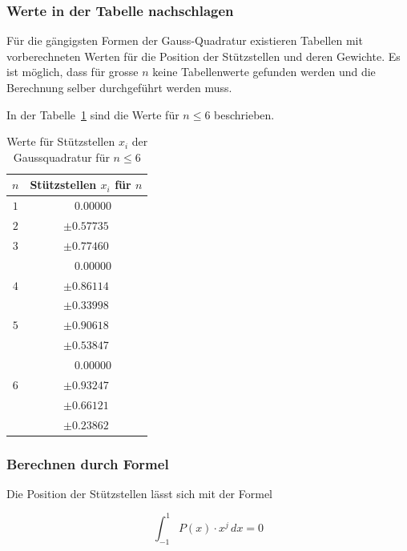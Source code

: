 \subsubsection{Werte in der Tabelle nachschlagen}
Für die gängigsten Formen der Gauss-Quadratur existieren Tabellen mit vorberechneten Werten für die
Position der Stützstellen und deren Gewichte. 
Es ist möglich, dass für grosse $n$ keine Tabellenwerte gefunden werden und die Berechnung 
selber durchgeführt werden muss.

In der Tabelle~\ref{buch:table:gaussabscissenwerte} sind die Werte für $n \leq 6$ beschrieben.

\begin{table}[h!]
    \centering
    \begin{tabular}{|c|c|}
        \hline
        $n$ & Stützstellen $x_{i}$ für $n$ \\
        \hline
        $1$ & $ \phantom{-} 0.00000 $ \\
        \hline
        $2$ & $ \pm 0.57735 $ \\
        \hline
        $3$ & $ \pm 0.77460 $ \\
            & $ \phantom{-} 0.00000 $ \\
        \hline
        $4$ & $ \pm 0.86114 $ \\
            & $ \pm 0.33998 $ \\
        \hline
        $5$ & $ \pm 0.90618 $ \\
            & $ \pm 0.53847 $ \\
            & $ \phantom{-} 0.00000 $ \\
        \hline
        $6$ & $ \pm 0.93247 $ \\
            & $ \pm 0.66121 $ \\
            & $ \pm 0.23862 $ \\
        \hline
    \end{tabular}
    \caption{Werte für Stützstellen $x_{i}$ der Gaussquadratur für $n \leq 6$
    \label{buch:table:gaussabscissenwerte}}    
\end{table}

\newpage

\subsubsection{Berechnen durch Formel}
Die Position der Stützstellen lässt sich mit der Formel

\begin{equation*}
    \int_{-1}^{1} P(x) \cdot x^{j} \, dx = 0
\end{equation*}

